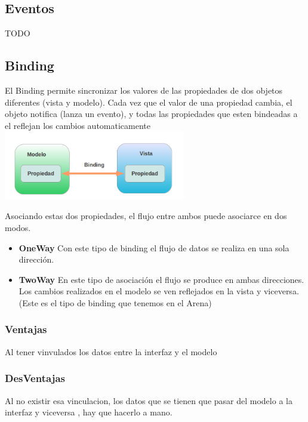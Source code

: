 \subsection{Eventos}

TODO\\

\subsection{Binding}
El Binding permite sincronizar los valores de las propiedades de dos objetos
diferentes (vista y modelo). Cada vez que el valor de una propiedad
cambia, el objeto notifica (lanza un evento), y todas las
propiedades que esten bindeadas a el reflejan los cambios automaticamente\\


\includegraphics[width=300px]{img/binding}

Asociando estas dos propiedades, el flujo entre ambos puede asociarce en dos
modos.

\begin {itemize}

\item {\bf OneWay}
Con este tipo de binding el flujo de datos se realiza en una sola dirección. 

\item {\bf TwoWay}
En este tipo de asociación el flujo se produce en ambas direcciones. Los cambios
realizados en el modelo se ven reflejados  en la vista y viceversa. (Este es el
tipo de binding que tenemos en el Arena)

\end {itemize}

\subsubsection{Ventajas}
Al tener vinvulados los datos entre la interfaz y el modelo

\subsubsection{DesVentajas}
Al no existir esa vinculacion, los datos que se tienen que pasar del modelo a la
interfaz y viceversa , hay que hacerlo a mano.


